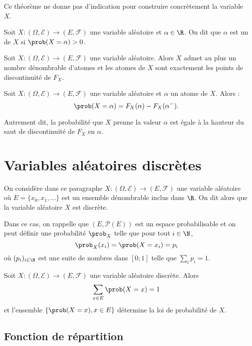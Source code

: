 Ce théorème ne donne pas d'indication pour construire concrètement la variable $X$. 

\begin{definition}{}{}
	Soit $X \colon (\Omega,\mathcal{E}) \to (E,\mathcal{F})$ une variable aléatoire et $\alpha \in \R$. On dit que $\alpha$ est un  de $X$ si $\prob(X=\alpha) >0$.
\end{definition}

\begin{proposition}{}{}
	Soit $X \colon (\Omega,\mathcal{E}) \to (E,\mathcal{F})$ une variable aléatoire. Alors $X$ admet au plus un nombre dénombrable d'atomes et les atomes de $X$ sont exactement les points de discontinuité de $F_X$.
\end{proposition}

\begin{proposition}{}{}
	Soit $X \colon (\Omega,\mathcal{E}) \to (E,\mathcal{F})$ une variable aléatoire et $\alpha$ un atome de $X$. Alors : 
	$$\prob(X=\alpha) = F_X(\alpha)-F_X(\alpha^-).$$
\end{proposition}

Autrement dit, la probabilité que $X$ prenne la valeur $\alpha$ est égale à la hauteur du saut de discontinuité de $F_X$ en $\alpha$.

\section{Variables aléatoires discrètes}

On considère dans ce paragraphe  $X \colon (\Omega,\mathcal{E}) \to (E,\mathcal{F})$ une variable aléatoire où $E=\{x_0,x_1,...\}$ est un ensemble dénombrable inclus dans $\R $. On dit alors que la variable aléatoire $X$ est discrète.

Dans ce cas, on rappelle que $(E,\mathcal{P}(E))$ est un espace probabilisable et on peut définir une probabilité $\prob_X$ telle que pour tout $i \in \N$, 
$$\prob_X(x_i) = \prob(X=x_i) = p_i$$
où $(p_i)_{i \in \N}$ est une suite de nombres dans $[0;1]$ telle que $\sum_i p_i = 1$.

\begin{definition}{}{}
	Soit $X \colon (\Omega,\mathcal{E}) \to (E,\mathcal{F})$ une variable aléatoire discrète. Alors $$\sum_{x \in E} \prob(X=x) =1$$
	et l'ensemble $\{\prob(X=x),x \in E\}$ détermine la loi de probabilité de $X$.
\end{definition}


\subsection{Fonction de répartition}

